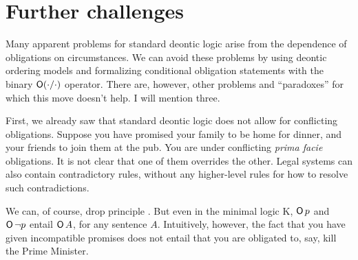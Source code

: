 


  
\section{Further challenges}

Many apparent problems for standard deontic logic arise from the dependence of
obligations on circumstances. We can avoid these problems by using deontic
ordering models and formalizing conditional obligation statements with the
binary $\operatorname{\mathsf{O}}(\cdot/\cdot)$ operator. There are, however, other problems and
``paradoxes'' for which this move doesn't help. I will mention three.

First, we already saw that standard deontic logic does not allow for conflicting
obligations. Suppose you have promised your family to be home for dinner, and
your friends to join them at the pub. You are under conflicting \emph{prima
  facie} obligations. It is not clear that one of them overrides the other.
Legal systems can also contain contradictory rules, without any higher-level
rules for how to resolve such contradictions.

We can, of course, drop principle . But even in the minimal logic K,
$\operatorname{\mathsf{O}} p$ and $\operatorname{\mathsf{O}} \neg p$ entail $\operatorname{\mathsf{O}} A$, for any sentence $A$. Intuitively,
however, the fact that you have given incompatible promises does not entail that
you are obligated to, say, kill the Prime Minister.



